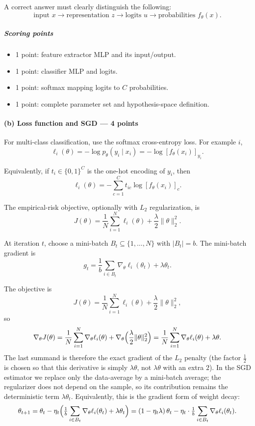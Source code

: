 \documentclass[11pt,a4paper]{article}
\theoremstyle{definition}
\begin{document}
A correct answer must clearly distinguish the following:
\[
\text{input }x
\longrightarrow
\text{representation }z
\longrightarrow
\text{logits }u
\longrightarrow
\text{probabilities }f_\theta(x).
\]

\subparagraph{Scoring points}
\begin{itemize}
    \item 1 point: feature extractor MLP and its input/output.
    \item 1 point: classifier MLP and logits.
    \item 1 point: softmax mapping logits to $C$ probabilities.
    \item 1 point: complete parameter set and hypothesis-space definition.
\end{itemize}


\paragraph{(b) Loss function and SGD --- 4 points}


For multi-class classification, use the softmax cross-entropy loss. For example $i$,
\[
\ell_i(\theta) = -\log p_\theta(y_i \mid x_i) = -\log [f_\theta(x_i)]_{y_i}.
\]

Equivalently, if $t_i \in \{0,1\}^C$ is the one-hot encoding of $y_i$, then
\[
\ell_i(\theta) = -\sum_{c=1}^{C} t_{ic} \log [f_\theta(x_i)]_c.
\]

The empirical-risk objective, optionally with $L_2$ regularization, is
\[
J(\theta) = \frac{1}{N} \sum_{i=1}^{N} \ell_i(\theta) + \frac{\lambda}{2} \|\theta\|_2^2.
\]

At iteration $t$, choose a mini-batch $B_t \subseteq \{1, \dots, N\}$ with $|B_t| = b$. The mini-batch gradient is
\[
g_t = \frac{1}{b} \sum_{i \in B_t} \nabla_\theta \ell_i(\theta_t) + \lambda \theta_t.
\]

\begin{remark}
The objective is
\[
J(\theta)=\frac{1}{N}\sum_{i=1}^{N}\ell_i(\theta)+\frac{\lambda}{2}\|\theta\|_2^2,
\]
so
\[
\nabla_\theta J(\theta)
=\frac{1}{N}\sum_{i=1}^{N}\nabla_\theta\ell_i(\theta)
+\nabla_\theta\Bigl(\frac{\lambda}{2}\|\theta\|_2^2\Bigr)
=\frac{1}{N}\sum_{i=1}^{N}\nabla_\theta\ell_i(\theta)+\lambda\theta.
\]
The last summand is therefore the exact gradient of the $L_2$ penalty (the factor $\tfrac12$ is chosen so that this derivative is simply $\lambda\theta$, not $\lambda\theta$ with an extra $2$). In the SGD estimator we replace only the data-average by a mini-batch average; the regularizer does not depend on the sample, so its contribution remains the deterministic term $\lambda\theta_t$. Equivalently, this is the gradient form of weight decay:
\[
\theta_{t+1}
=\theta_t-\eta_t\Bigl(\tfrac{1}{b}\sum_{i\in B_t}\nabla_\theta\ell_i(\theta_t)+\lambda\theta_t\Bigr)
=(1-\eta_t\lambda)\,\theta_t-\eta_t\cdot\tfrac{1}{b}\sum_{i\in B_t}\nabla_\theta\ell_i(\theta_t).
\]
\end{remark}
\end{document}
